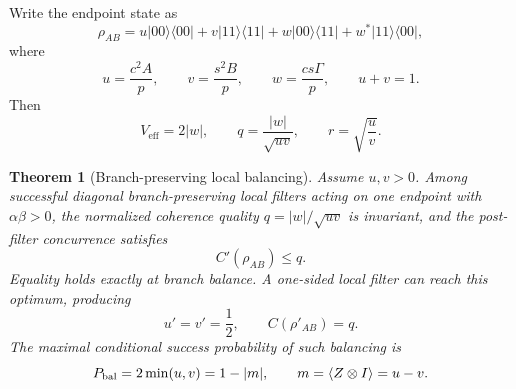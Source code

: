 \documentclass[reprint,aps,pra,superscriptaddress,nofootinbib,longbibliography]{revtex4-2}
\newtheorem{theorem}{Theorem}
\newcommand{\ket}[1]{|#1\rangle}
\newcommand{\bra}[1]{\langle #1|}
\newcommand{\Veff}{V_{\mathrm{eff}}}
\begin{document}
Write the endpoint state as
\begin{equation}
\rho_{AB}
=u\ket{00}\bra{00}+v\ket{11}\bra{11}
+w\ket{00}\bra{11}+w^*\ket{11}\bra{00},
\label{eq:uv-state}
\end{equation}
where
\begin{equation}
u=\frac{c^2A}{p},
\qquad
v=\frac{s^2B}{p},
\qquad
w=\frac{cs\Gamma}{p},
\qquad
u+v=1.
\label{eq:uvw}
\end{equation}
Then
\begin{equation}
\Veff=2|w|,
\qquad
q=\frac{|w|}{\sqrt{uv}},
\qquad
r=\sqrt{\frac{u}{v}}.
\label{eq:q-r-uv}
\end{equation}

\begin{theorem}[Branch-preserving local balancing]
Assume \(u,v>0\).  Among successful diagonal branch-preserving local filters acting on one endpoint with \(\alpha\beta>0\), the normalized coherence quality \(q=|w|/\sqrt{uv}\) is invariant, and the post-filter concurrence satisfies
\begin{equation}
C'(\rho_{AB})\le q.
\label{eq:Cprime-bound}
\end{equation}
Equality holds exactly at branch balance.  A one-sided local filter can reach this optimum, producing
\begin{equation}
u'=v'=\frac12,
\qquad
C(\rho'_{AB})=q.
\label{eq:balanced-state-result}
\end{equation}
The maximal conditional success probability of such balancing is
\begin{equation}
P_{\rm bal}=2\min(u,v)=1-|m|,
\qquad
m=\langle Z\otimes I\rangle=u-v.
\label{eq:Pbal}
\end{equation}
\end{theorem}
\end{document}
